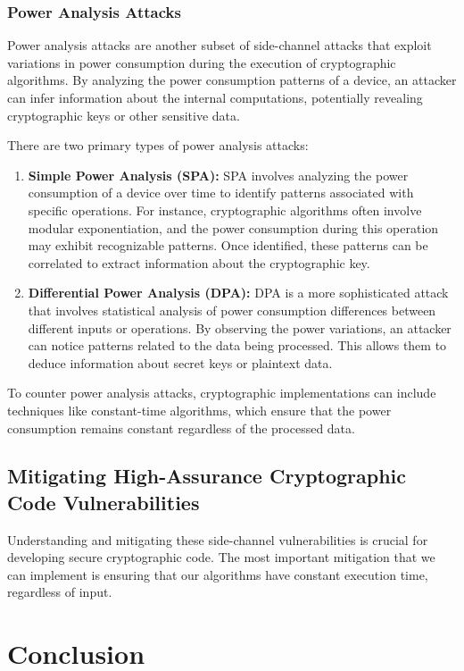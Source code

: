 \documentclass[runningheads]{llncs}
\begin{document}
\subsubsection{Power Analysis Attacks}
Power analysis attacks are another subset of side-channel attacks that exploit variations in power consumption during the execution of cryptographic algorithms. By analyzing the power consumption patterns of a device, an attacker can infer information about the internal computations, potentially revealing cryptographic keys or other sensitive data.

There are two primary types of power analysis attacks:

\begin{enumerate}
    \item \textbf{Simple Power Analysis (SPA):} SPA involves analyzing the power consumption of a device over time to identify patterns associated with specific operations. For instance, cryptographic algorithms often involve modular exponentiation, and the power consumption during this operation may exhibit recognizable patterns. Once identified, these patterns can be correlated to extract information about the cryptographic key.
    \item \textbf{Differential Power Analysis (DPA):} DPA is a more sophisticated attack that involves statistical analysis of power consumption differences between different inputs or operations. By observing the power variations, an attacker can notice patterns related to the data being processed. This allows them to deduce information about secret keys or plaintext data.

\end{enumerate}

To counter power analysis attacks, cryptographic implementations can include techniques like constant-time algorithms, which ensure that the power consumption remains constant regardless of the processed data.


\subsection{Mitigating High-Assurance Cryptographic Code Vulnerabilities}
Understanding and mitigating these side-channel vulnerabilities is crucial for developing secure cryptographic code. The most important mitigation that we can implement is ensuring that our algorithms have constant execution time, regardless of input.


\section{Conclusion}
\end{document}
